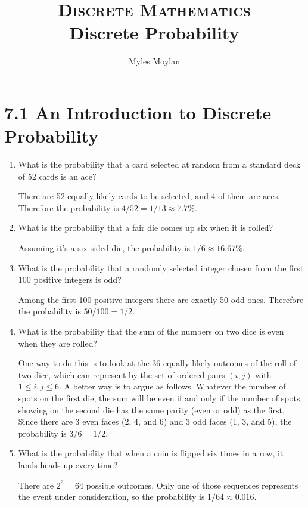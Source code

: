 \documentclass[11pt]{article}
\title{	
	\normalfont \normalsize 
	\textsc{Discrete Mathematics} \\
	\huge Discrete Probability \\
}
\author{Myles Moylan} %
\date{} %
\begin{document}
	
\maketitle

\section*{\textbf{7.1 An Introduction to Discrete Probability}}
\begin{enumerate}[label=\textbf{\arabic*.}]
	\item What is the probability that a card selected at random from a standard deck of 52 cards is an ace?
	
	There are 52 equally likely cards to be selected, and 4 of them are aces. Therefore the probability is $4 / 52 = 1 / 13 \approx 7.7\%$.
	
	\item What is the probability that a fair die comes up six when it is rolled?
	
	Assuming it's a six sided die, the probability is $1 / 6 \approx 16.67\%$.
	
	\item What is the probability that a randomly selected integer chosen from the first 100 positive integers is odd?
	
	Among the first 100 positive integers there are exactly 50 odd ones. Therefore the probability is $50 / 100 = 1 / 2$.
	
	\item What is the probability that the sum of the numbers on two dice is even when they are rolled?
	
	One way to do this is to look at the 36 equally likely outcomes of the roll of two dice, which can represent by the set of ordered pairs $(i, j)$ with $1 \leq i, j \leq 6$. A better way is to argue as follows. Whatever the number of spots on the first die, the sum will be even if and only if the number of spots showing on the second die has the same parity (even or odd) as the first. Since there are 3 even faces (2, 4, and 6) and 3 odd faces (1, 3, and 5), the probability is $3 / 6 = 1 / 2$.
	
	\item What is the probability that when a coin is flipped six times in a row, it lands heads up every time?
	
	There are $2^6 = 64$ possible outcomes. Only one of those sequences represents the event under consideration, so the probability is $1 / 64 \approx 0.016$.
	

\end{enumerate}
\end{document}

